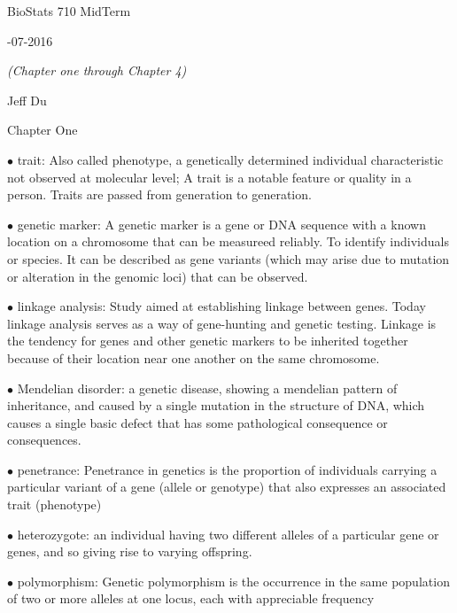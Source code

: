 \documentclass{article}
\begin{document}
\centerline{\sc \large BioStats 710 MidTerm}
\vspace{1pc}
\centerline{-07-2016}
\vspace{1pc}

\centerline{\it (Chapter one through Chapter 4)}

\vspace{1pc}
\centerline{\sc    Jeff Du}
\vspace{2pc}


\centerline{\sc Chapter One}
\vspace{0.2in}

$\bullet$ trait: 
Also called phenotype, a genetically determined individual characteristic not observed at molecular level; A trait is a notable feature or quality in a person. Traits are passed from generation to generation.


\vspace{0.1in}
$\bullet$ genetic marker: 
A genetic marker is a gene or DNA sequence with a known location on a chromosome that can be measureed reliably. 
To identify individuals or species. It can be described as gene variants (which may arise due to mutation or alteration in the genomic loci) that can be observed. 


\vspace{0.1in}
$\bullet$ linkage analysis: 
Study aimed at establishing linkage between genes. Today linkage analysis serves as a way of gene-hunting and genetic testing. Linkage is the tendency for genes and other genetic markers to be inherited together because of their location near one another on the same chromosome.


\vspace{0.1in}
$\bullet$ Mendelian disorder: 
a genetic disease, showing a mendelian pattern of inheritance, and caused by a single mutation in the structure of DNA, which causes a single basic defect that has some pathological consequence or consequences.


\vspace{0.1in}
$\bullet$ penetrance: 
Penetrance in genetics is the proportion of individuals carrying a particular variant of a gene (allele or genotype) that also expresses an associated trait (phenotype)


\vspace{0.1in}
$\bullet$ heterozygote: 
an individual having two different alleles of a particular gene or genes, and so giving rise to varying offspring.


\vspace{0.1in}
$\bullet$ polymorphism: 
Genetic polymorphism is the occurrence in the same population of two or more alleles at one locus, each with appreciable frequency
\end{document}
